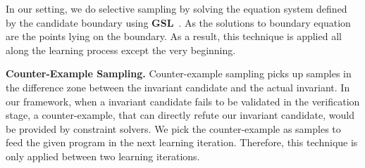 In our setting, %
we do selective sampling by solving the equation system defined by the candidate boundary using \textbf{GSL}~\cite{gough2009gnu}.
As the solutions to boundary equation are the points lying on the boundary. 
As a result, this technique is applied all along the learning process except the very beginning.

\medskip\noindent
\textbf{Counter-Example Sampling.}
Counter-example sampling picks up samples in the difference zone between the invariant candidate and the actual invariant.
In our framework, when a invariant candidate fails to be validated in the verification stage,
a counter-example, that can directly refute our invariant candidate, would be provided by constraint solvers.
We pick the counter-example as samples to feed the given program in the next learning iteration.
Therefore, this technique is only applied between two learning iterations.

